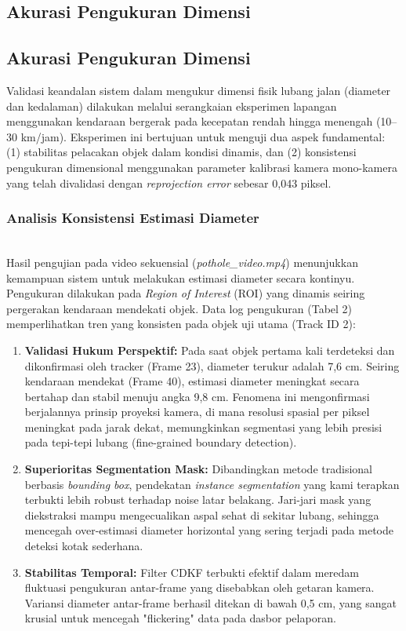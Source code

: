 \documentclass{iopjournal}
\begin{document}
\subsection{Akurasi Pengukuran Dimensi}

\subsection{Akurasi Pengukuran Dimensi}

Validasi keandalan sistem dalam mengukur dimensi fisik lubang jalan (diameter dan kedalaman) dilakukan melalui serangkaian eksperimen lapangan menggunakan kendaraan bergerak pada kecepatan rendah hingga menengah (10--30 km/jam). Eksperimen ini bertujuan untuk menguji dua aspek fundamental: (1) stabilitas pelacakan objek dalam kondisi dinamis, dan (2) konsistensi pengukuran dimensional menggunakan parameter kalibrasi kamera mono-kamera yang telah divalidasi dengan \textit{reprojection error} sebesar 0,043 piksel.

\subsubsection{Analisis Konsistensi Estimasi Diameter}
\mbox{}\\
Hasil pengujian pada video sekuensial (\textit{pothole\_video.mp4}) menunjukkan kemampuan sistem untuk melakukan estimasi diameter secara kontinyu. Pengukuran dilakukan pada \textit{Region of Interest} (ROI) yang dinamis seiring pergerakan kendaraan mendekati objek. Data log pengukuran (Tabel 2) memperlihatkan tren yang konsisten pada objek uji utama (Track ID 2):

\begin{enumerate}
    \item \textbf{Validasi Hukum Perspektif:} Pada saat objek pertama kali terdeteksi dan dikonfirmasi oleh tracker (Frame 23), diameter terukur adalah 7,6 cm. Seiring kendaraan mendekat (Frame 40), estimasi diameter meningkat secara bertahap dan stabil menuju angka 9,8 cm. Fenomena ini mengonfirmasi berjalannya prinsip proyeksi kamera, di mana resolusi spasial per piksel meningkat pada jarak dekat, memungkinkan segmentasi yang lebih presisi pada tepi-tepi lubang (fine-grained boundary detection).
    \item \textbf{Superioritas Segmentation Mask:} Dibandingkan metode tradisional berbasis \textit{bounding box}, pendekatan \textit{instance segmentation} yang kami terapkan terbukti lebih robust terhadap noise latar belakang. Jari-jari mask yang diekstraksi mampu mengecualikan aspal sehat di sekitar lubang, sehingga mencegah over-estimasi diameter horizontal yang sering terjadi pada metode deteksi kotak sederhana.
    \item \textbf{Stabilitas Temporal:} Filter CDKF terbukti efektif dalam meredam fluktuasi pengukuran antar-frame yang disebabkan oleh getaran kamera. Variansi diameter antar-frame berhasil ditekan di bawah 0,5 cm, yang sangat krusial untuk mencegah "flickering" data pada dasbor pelaporan.
\end{enumerate}
\end{document}
